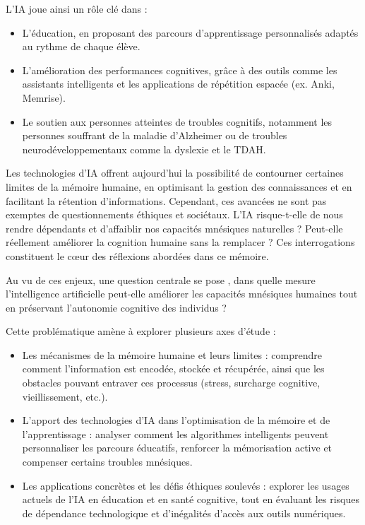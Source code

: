 \documentclass[12pt,a4paper]{report}
\begin{document}
L’IA joue ainsi un rôle clé dans :
\begin{itemize}

    \item L’éducation, en proposant des parcours d’apprentissage personnalisés adaptés au rythme de chaque élève.
    \item L’amélioration des performances cognitives, grâce à des outils comme les assistants intelligents et les applications de répétition espacée (ex. Anki, Memrise).
    \item Le soutien aux personnes atteintes de troubles cognitifs, notamment les personnes souffrant de la maladie d’Alzheimer ou de troubles neurodéveloppementaux comme la dyslexie et le TDAH.

\end{itemize}

Les technologies d’IA offrent aujourd’hui la possibilité de contourner certaines limites de la mémoire humaine, en optimisant la gestion des connaissances et en facilitant la rétention d’informations. Cependant, ces avancées ne sont pas exemptes de questionnements éthiques et sociétaux. L’IA risque-t-elle de nous rendre dépendants et d’affaiblir nos capacités mnésiques naturelles ? Peut-elle réellement améliorer la cognition humaine sans la remplacer ? Ces interrogations constituent le cœur des réflexions abordées dans ce mémoire.

Au vu de ces enjeux, une question centrale se pose , dans quelle mesure l’intelligence artificielle peut-elle améliorer les capacités mnésiques humaines tout en préservant l’autonomie cognitive des individus ?

Cette problématique amène à explorer plusieurs axes d’étude :
\begin{itemize}

    \item Les mécanismes de la mémoire humaine et leurs limites : comprendre comment l’information est encodée, stockée et récupérée, ainsi que les obstacles pouvant entraver ces processus (stress, surcharge cognitive, vieillissement, etc.).

    \item L’apport des technologies d’IA dans l’optimisation de la mémoire et de l’apprentissage : analyser comment les algorithmes intelligents peuvent personnaliser les parcours éducatifs, renforcer la mémorisation active et compenser certains troubles mnésiques.

    \item Les applications concrètes et les défis éthiques soulevés : explorer les usages actuels de l’IA en éducation et en santé cognitive, tout en évaluant les risques de dépendance technologique et d’inégalités d’accès aux outils numériques.

\end{itemize}
\end{document}

